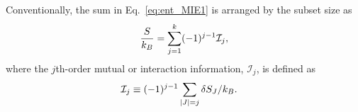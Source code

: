 \documentclass[reprint, superscriptaddress]{revtex4-1}
\newcommand{\note}[1]{{\color{DarkGreen}\footnotesize \textsc{Note.} #1}}
\newcommand{\MI}{\mathcal I} %
\begin{document}
Conventionally, the sum in Eq.~\eqref{eq:ent_MIE1}
is arranged by the subset size as
\begin{equation}
  \frac{S}{k_B}
  =
  \sum_{j = 1}^k (-1)^{j-1} \MI_j
  ,
  \notag
\end{equation}
%
where the $j$th-order mutual or interaction information, $\MI_j$, is defined as
%
\begin{align}
  \MI_j
  &\equiv (-1)^{j-1} \sum_{|J| = j}
  \delta S_J / k_B
  .
  \notag
\end{align}
%

%
\end{document}
